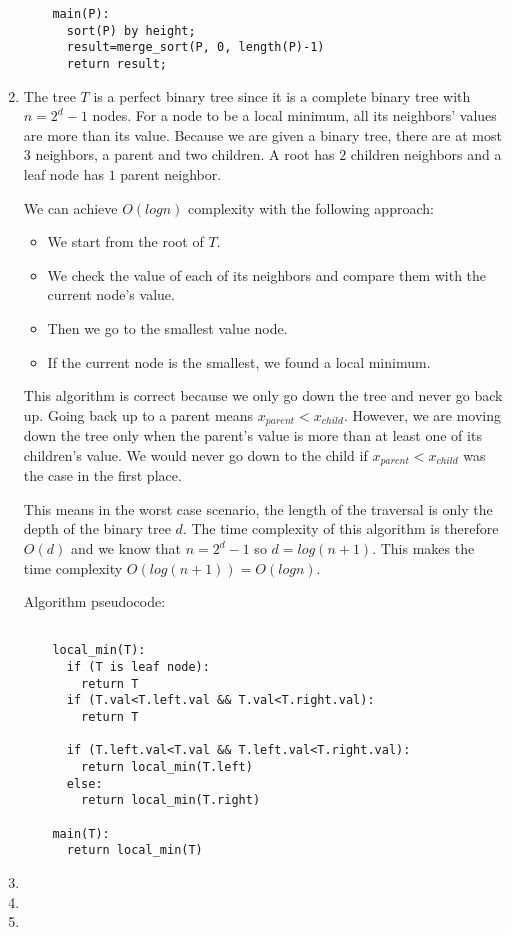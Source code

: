 \documentclass{article}
\begin{document}
\begin{enumerate}
\begin{lstlisting}
    main(P):
      sort(P) by height;
      result=merge_sort(P, 0, length(P)-1)
      return result;

  \end{lstlisting}
  \item The tree $T$ is a perfect binary tree since it is a complete binary tree with $n=2^d-1$ nodes.
  For a node to be a local minimum, all its neighbors' values are more than its value.
  Because we are given a binary tree, there are at most $3$ neighbors, a parent and two children.
  A root has $2$ children neighbors and a leaf node has $1$ parent neighbor.

  We can achieve $O(logn)$ complexity with the following approach:

  \begin{itemize}
    \item We start from the root of $T$.
    \item We check the value of each of its neighbors and compare them with the current node's value.
    \item Then we go to the smallest value node.
    \item If the current node is the smallest, we found a local minimum.
  \end{itemize}

  This algorithm is correct because we only go down the tree and never go back up.
  Going back up to a parent means $x_{parent}<x_{child}$.
  However, we are moving down the tree only when the parent's value is more than at least one of its children's value.
  We would never go down to the child if $x_{parent}<x_{child}$ was the case in the first place.

  This means in the worst case scenario, the length of the traversal is only the depth of the binary tree $d$.
  The time complexity of this algorithm is therefore $O(d)$ and we know that $n=2^d-1$ so $d=log(n+1)$.
  This makes the time complexity $O(log(n+1))=O(logn)$.

  Algorithm pseudocode:

  \begin{lstlisting}

    local_min(T):
      if (T is leaf node):
        return T
      if (T.val<T.left.val && T.val<T.right.val):
        return T
      
      if (T.left.val<T.val && T.left.val<T.right.val):
        return local_min(T.left)
      else:
        return local_min(T.right)
    
    main(T):
      return local_min(T)

  \end{lstlisting}
  \item 
  \item 
  \item 
\end{enumerate}
\end{document}
